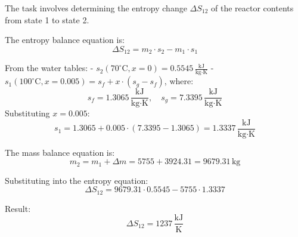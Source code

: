 The task involves determining the entropy change \( \Delta S_{12} \) of the reactor contents from state 1 to state 2.  

The entropy balance equation is:  
\[
\Delta S_{12} = m_2 \cdot s_2 - m_1 \cdot s_1
\]

From the water tables:  
- \( s_2(70^\circ\text{C}, x=0) = 0.5545 \, \frac{\text{kJ}}{\text{kg·K}} \)  
- \( s_1(100^\circ\text{C}, x=0.005) = s_f + x \cdot (s_g - s_f) \), where:  
  \[
  s_f = 1.3065 \, \frac{\text{kJ}}{\text{kg·K}}, \quad s_g = 7.3395 \, \frac{\text{kJ}}{\text{kg·K}}
  \]
  Substituting \( x = 0.005 \):  
  \[
  s_1 = 1.3065 + 0.005 \cdot (7.3395 - 1.3065) = 1.3337 \, \frac{\text{kJ}}{\text{kg·K}}
  \]

The mass balance equation is:  
\[
m_2 = m_1 + \Delta m = 5755 + 3924.31 = 9679.31 \, \text{kg}
\]

Substituting into the entropy equation:  
\[
\Delta S_{12} = 9679.31 \cdot 0.5545 - 5755 \cdot 1.3337
\]

Result:  
\[
\Delta S_{12} = 1237 \, \frac{\text{kJ}}{\text{K}}
\]
